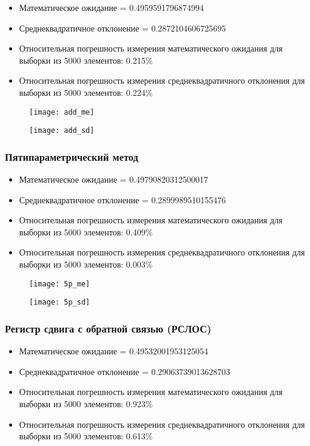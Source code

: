 \documentclass[spec, och, labwork]{SCWorks}
\begin{document}
\begin{itemize}
  \item Математическое ожидание = 0.4959591796874994
  \item Среднеквадратичное отклонение = 0.2872104606725695
  \item Относительная погрешность измерения математического ожидания для выборки из 5000 элементов: 0.215\%
  \item Относительная погрешность измерения среднеквадратичного отклонения для выборки из 5000 элементов: 0.224\%
\end{itemize}

\begin{figure}[H]
  \centering
  \texttt{[image: add\_me]}
\end{figure}
\begin{figure}[H]
  \centering
  \texttt{[image: add\_sd]}
\end{figure}

\subsubsection{Пятипараметрический метод}

\begin{itemize}
  \item Математическое ожидание = 0.49790820312500017
  \item Среднеквадратичное отклонение = 0.2899989510155476
  \item Относительная погрешность измерения математического ожидания для выборки из 5000 элементов: 0.409\%
  \item Относительная погрешность измерения среднеквадратичного отклонения для выборки из 5000 элементов: 0.003\%
\end{itemize}

\begin{figure}[H]
  \centering
  \texttt{[image: 5p\_me]}
\end{figure}
\begin{figure}[H]
  \centering
  \texttt{[image: 5p\_sd]}
\end{figure}

\subsubsection{Регистр сдвига с обратной связью (РСЛОС)}

\begin{itemize}
  \item Математическое ожидание = 0.49532001953125054
  \item Среднеквадратичное отклонение = 0.29063739013628703
  \item Относительная погрешность измерения математического ожидания для выборки из 5000 элементов: 0.923\%
  \item Относительная погрешность измерения среднеквадратичного отклонения для выборки из 5000 элементов: 0.613\%
\end{itemize}
\end{document}
